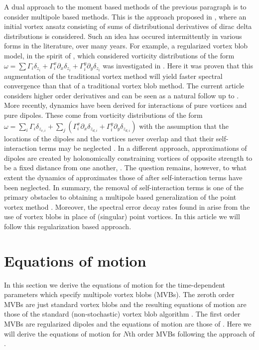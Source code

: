 \documentclass[12pt]{amsart}
\theoremstyle{remark}
\begin{document}
A dual approach to the moment based methods of the previous paragraph \cite{Rossi1997,Rossi2005,NagemSandriUminskyWayne2009} is to consider multipole based methods.
This is the approach proposed in \cite{Nicolaides1986}, where an initial vortex ansatz consisting of sums of distributional derivatives of dirac delta distributions is considered.
Such an idea has occured intermittently in various forms in the literature, over many years.
For example, a regularized vortex blob model, in the spirit of \cite{BealeMajda1982,BealeMajda1985}, which considered vorticity distributions of the form $\omega = \sum \Gamma_i \delta_{z_i} + \Gamma_i^x \partial_x \delta_{z_i} + \Gamma_i^y \partial_y \delta_{z_i}$ was investigated in \cite{ChiuNivolaides1988}.
Here it was proven that this augmentation of the traditional vortex method will yield faster spectral convergence than that of a traditional vortex blob method.
The current article considers higher order derivatives and can be seen as a natural follow up to \cite{ChiuNivolaides1988}.
More recently, dynamics have been derived for interactions of pure vortices and pure dipoles.
These come from vorticity distributions of the form $\omega = \sum_{i} \Gamma_i \delta_{z_{v,i}} +  \sum_{j} \left(\Gamma_i^x \partial_x \delta_{z_{d,i}} + \Gamma_i^y \partial_y \delta_{z_{d,i}}\right)$
\color{red}
with the assumption that the locations of the dipoles and the vortices never overlap and that their self-interaction terms may be neglected \cite{Yanovsky2009,TurYanovskyKonstantin2011}.
In a different approach, approximations of dipoles are created by holonomically constraining vortices of opposite strength to be a fixed distance from one another, \cite{TchieuKansoNewton2012}. The question remains, however, to what extent the dynamics of \cite{TchieuKansoNewton2012} approximates those of \cite{Yanovsky2009,TurYanovskyKonstantin2011} after self-interaction terms have been neglected.
\color{black}
In summary, the removal of self-interaction terms is one of the primary obstacles to obtaining a multipole based generalization of the point vortex method \cite{Smith2011}.
Moreover, the spectral error decay rates found in \cite{Hald1979,BealeMajda1982,BealeMajda1985,ChiuNivolaides1988} arise from the use of vortex blobs in place of (singular) point vortices.
In this article we will follow this regularization based approach.%

\section{Equations of motion}
\label{sec:EOM}
In this section we derive the equations of motion for the time-dependent parameters which specify multipole vortex blobs (MVBs).
The zeroth order MVBs are just standard vortex blobs and the resulting equations of motion are those of the standard (non-stochastic) vortex blob algorithm \cite{Chorin1973}.
The first order MVBs are regularized dipoles and the equations of motion are those of \cite{ChiuNivolaides1988}.
Here we will derive the equations of motion for $N$th order MVBs following the approach of \cite{ChiuNivolaides1988}.
\end{document}
